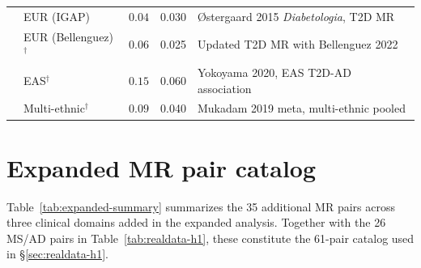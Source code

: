 \documentclass{article}
\begin{document}
\begin{table}[h]
\begin{tabular}{@{}llccp{4.5cm}@{}}
\midrule
{}
& EUR (IGAP) & $0.04$ & 0.030 & {\O}stergaard 2015 \emph{Diabetologia}, T2D MR \\
& EUR (Bellenguez)$^\dagger$ & $0.06$ & 0.025 & Updated T2D MR with Bellenguez 2022 \\
& EAS$^\dagger$ & $0.15$ & 0.060 & Yokoyama 2020, EAS T2D-AD association \\
& Multi-ethnic$^\dagger$ & $0.09$ & 0.040 & Mukadam 2019 meta, multi-ethnic pooled \\
\bottomrule
\end{tabular}
\end{table}

\section{Expanded MR pair catalog}
\label{app:expanded-mr}

Table~\ref{tab:expanded-summary} summarizes the 35 additional MR pairs across three clinical domains added in the expanded analysis. Together with the 26 MS/AD pairs in Table~\ref{tab:realdata-h1}, these constitute the 61-pair catalog used in \S\ref{sec:realdata-h1}.
\end{document}
